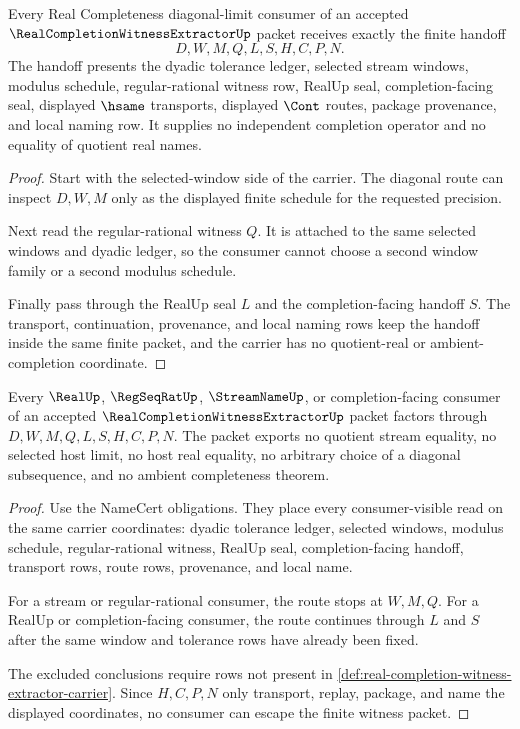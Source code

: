 \begin{theorem}
\label{thm:real-completion-witness-extractor-diagonal-handoff}
Every Real Completeness diagonal-limit consumer of an accepted
$\RealCompletionWitnessExtractorUp$ packet receives exactly the finite handoff
$$
D,W,M,Q,L,S,H,C,P,N.
$$
The handoff presents the dyadic tolerance ledger, selected stream windows,
modulus schedule, regular-rational witness row, RealUp seal, completion-facing
seal, displayed $\hsame$ transports, displayed $\Cont$ routes, package
provenance, and local naming row. It supplies no independent completion
operator and no equality of quotient real names.
\end{theorem}
\begin{proof}
Start with the selected-window side of the carrier. The diagonal route can
inspect $D,W,M$ only as the displayed finite schedule for the requested
precision.

Next read the regular-rational witness $Q$. It is attached to the same
selected windows and dyadic ledger, so the consumer cannot choose a second
window family or a second modulus schedule.

Finally pass through the RealUp seal $L$ and the completion-facing handoff
$S$. The transport, continuation, provenance, and local naming rows keep the
handoff inside the same finite packet, and the carrier has no quotient-real
or ambient-completion coordinate.
\end{proof}

\begin{theorem}
\label{thm:real-completion-witness-extractor-nonescape}
Every $\RealUp$, $\RegSeqRatUp$, $\StreamNameUp$, or completion-facing
consumer of an accepted $\RealCompletionWitnessExtractorUp$ packet factors
through $D,W,M,Q,L,S,H,C,P,N$. The packet exports no quotient stream equality,
no selected host limit, no host real equality, no arbitrary choice of a
diagonal subsequence, and no ambient completeness theorem.
\end{theorem}
\begin{proof}
Use the NameCert obligations. They place every consumer-visible read on the
same carrier coordinates: dyadic tolerance ledger, selected windows, modulus
schedule, regular-rational witness, RealUp seal, completion-facing handoff,
transport rows, route rows, provenance, and local name.

For a stream or regular-rational consumer, the route stops at $W,M,Q$. For a
RealUp or completion-facing consumer, the route continues through $L$ and
$S$ after the same window and tolerance rows have already been fixed.

The excluded conclusions require rows not present in
\autoref{def:real-completion-witness-extractor-carrier}. Since $H,C,P,N$
only transport, replay, package, and name the displayed coordinates, no
consumer can escape the finite witness packet.
\end{proof}

